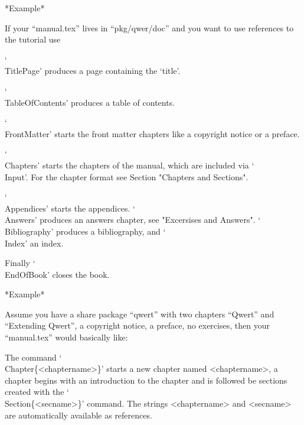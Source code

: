 *Example*

If your  ``manual.tex''  lives in  ``pkg/qwer/doc''  and you want  to use
references to the tutorial use

\begintt
\endtt

`\\TitlePage' produces a page containing the `title'.

`\\TableOfContents' produces a table of contents.

`\\FrontMatter' starts the front matter  chapters like a copyright notice
or a preface.

`\\Chapters'  starts the chapters  of the manual,  which are included via
`\\Input'.  For the chapter format see Section "Chapters and Sections".

`\\Appendices'  starts the appendices.   `\\Answers'  produces an answers
chapter, see  "Excersises  and  Answers".  `\\Bibliography'  produces   a
bibliography, and `\\Index' an index.

Finally `\\EndOfBook' closes the book.

*Example*

Assume you have a share package ``qwert'' with two chapters ``Qwert'' and
``Extending  Qwert'', a copyright  notice,  a preface, no exercises, then
your ``manual.tex'' would basically like:

\begintt
  
    \FrontMatter
      \TableOfContents
    \Chapters
    \Appendices
      \Index
  \EndOfBook
\endtt


The  command `\\Chapter\{<chaptername>\}'  starts  a  new  chapter  named
<chaptername>,  a chapter begins with an  introduction to the chapter and
is  followed be sections     created with the    `\\Section\{<secname>\}'
command.  The   strings  <chaptername> and  <secname>   are automatically
available as references.

